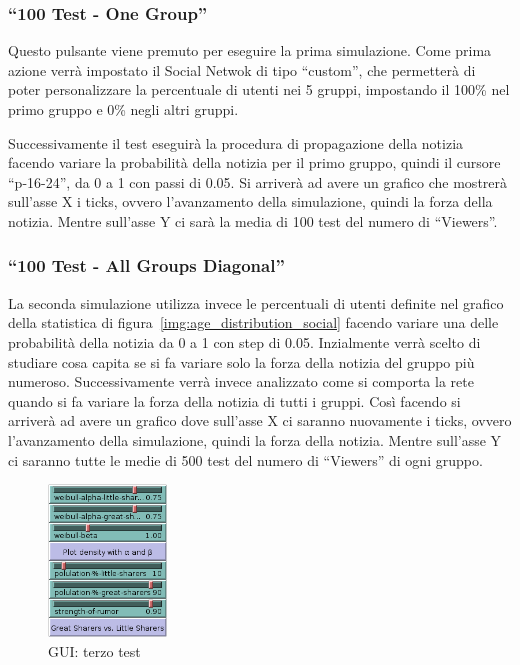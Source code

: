 \subsubsection{``100 Test - One Group''}
Questo pulsante viene premuto per eseguire la prima simulazione. 
Come prima azione verrà impostato il Social Netwok di tipo ``custom'', che permetterà di poter personalizzare
la percentuale di utenti nei 5 gruppi, impostando il 100\% nel primo gruppo e 0\% negli altri gruppi. 

Successivamente il test eseguirà la procedura di propagazione della notizia facendo variare la probabilità 
della notizia per il primo gruppo, quindi il cursore ``p-16-24'', da 0 a 1 con passi di 0.05.
Si arriverà ad avere un grafico che mostrerà sull'asse X i ticks, ovvero l'avanzamento della simulazione, quindi la forza della notizia. 
Mentre sull'asse Y ci sarà la media di 100 test del numero di ``Viewers''.

\subsubsection{``100 Test - All Groups Diagonal''}
La seconda simulazione utilizza invece le percentuali di utenti definite nel grafico della statistica di figura~\ref{img:age_distribution_social}
facendo variare una delle probabilità della notizia da 0 a 1 con step di 0.05.
Inzialmente verrà scelto di studiare cosa capita se si fa variare solo la forza della notizia del gruppo più numeroso.
Successivamente verrà invece analizzato come si comporta la rete quando si fa variare la forza della notizia di tutti i gruppi.
Così facendo si arriverà ad avere un grafico dove sull'asse X ci saranno nuovamente i ticks, ovvero l'avanzamento della simulazione, quindi la forza della notizia.
Mentre sull'asse Y ci saranno tutte le medie di 500 test del numero di ``Viewers'' di ogni gruppo.

\begin{figure}
  \vspace*{-35pt}
  \begin{center}
    \includegraphics[width=0.28\textwidth]{img/gui-third-test.png}
  \end{center}
 \vspace*{-10pt}
 \caption{GUI: terzo test}
 \vspace*{-20pt}
 \label{img:gui_third_test}
\end{figure}



